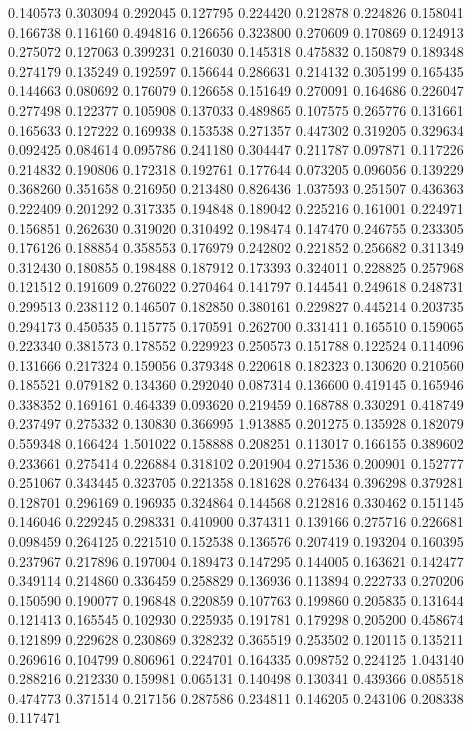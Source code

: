 0.140573
0.303094
0.292045
0.127795
0.224420
0.212878
0.224826
0.158041
0.166738
0.116160
0.494816
0.126656
0.323800
0.270609
0.170869
0.124913
0.275072
0.127063
0.399231
0.216030
0.145318
0.475832
0.150879
0.189348
0.274179
0.135249
0.192597
0.156644
0.286631
0.214132
0.305199
0.165435
0.144663
0.080692
0.176079
0.126658
0.151649
0.270091
0.164686
0.226047
0.277498
0.122377
0.105908
0.137033
0.489865
0.107575
0.265776
0.131661
0.165633
0.127222
0.169938
0.153538
0.271357
0.447302
0.319205
0.329634
0.092425
0.084614
0.095786
0.241180
0.304447
0.211787
0.097871
0.117226
0.214832
0.190806
0.172318
0.192761
0.177644
0.073205
0.096056
0.139229
0.368260
0.351658
0.216950
0.213480
0.826436
1.037593
0.251507
0.436363
0.222409
0.201292
0.317335
0.194848
0.189042
0.225216
0.161001
0.224971
0.156851
0.262630
0.319020
0.310492
0.198474
0.147470
0.246755
0.233305
0.176126
0.188854
0.358553
0.176979
0.242802
0.221852
0.256682
0.311349
0.312430
0.180855
0.198488
0.187912
0.173393
0.324011
0.228825
0.257968
0.121512
0.191609
0.276022
0.270464
0.141797
0.144541
0.249618
0.248731
0.299513
0.238112
0.146507
0.182850
0.380161
0.229827
0.445214
0.203735
0.294173
0.450535
0.115775
0.170591
0.262700
0.331411
0.165510
0.159065
0.223340
0.381573
0.178552
0.229923
0.250573
0.151788
0.122524
0.114096
0.131666
0.217324
0.159056
0.379348
0.220618
0.182323
0.130620
0.210560
0.185521
0.079182
0.134360
0.292040
0.087314
0.136600
0.419145
0.165946
0.338352
0.169161
0.464339
0.093620
0.219459
0.168788
0.330291
0.418749
0.237497
0.275332
0.130830
0.366995
1.913885
0.201275
0.135928
0.182079
0.559348
0.166424
1.501022
0.158888
0.208251
0.113017
0.166155
0.389602
0.233661
0.275414
0.226884
0.318102
0.201904
0.271536
0.200901
0.152777
0.251067
0.343445
0.323705
0.221358
0.181628
0.276434
0.396298
0.379281
0.128701
0.296169
0.196935
0.324864
0.144568
0.212816
0.330462
0.151145
0.146046
0.229245
0.298331
0.410900
0.374311
0.139166
0.275716
0.226681
0.098459
0.264125
0.221510
0.152538
0.136576
0.207419
0.193204
0.160395
0.237967
0.217896
0.197004
0.189473
0.147295
0.144005
0.163621
0.142477
0.349114
0.214860
0.336459
0.258829
0.136936
0.113894
0.222733
0.270206
0.150590
0.190077
0.196848
0.220859
0.107763
0.199860
0.205835
0.131644
0.121413
0.165545
0.102930
0.225935
0.191781
0.179298
0.205200
0.458674
0.121899
0.229628
0.230869
0.328232
0.365519
0.253502
0.120115
0.135211
0.269616
0.104799
0.806961
0.224701
0.164335
0.098752
0.224125
1.043140
0.288216
0.212330
0.159981
0.065131
0.140498
0.130341
0.439366
0.085518
0.474773
0.371514
0.217156
0.287586
0.234811
0.146205
0.243106
0.208338
0.117471
